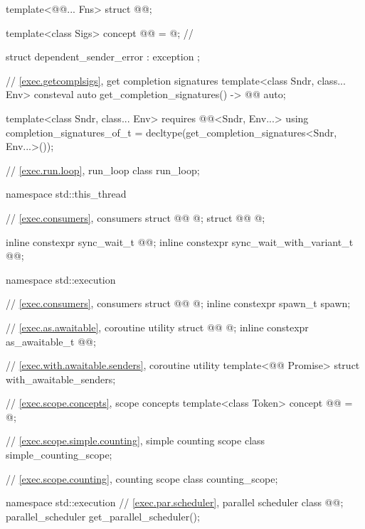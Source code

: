 \begin{codeblock}
{  template<@@... Fns>
    struct @@;

  template<class Sigs>
    concept @@ = @\seebelownc@;            // \expos

  struct dependent_sender_error : exception {};

  // \ref{exec.getcomplsigs}, get completion signatures
  template<class Sndr, class... Env>
    consteval auto get_completion_signatures() -> @@ auto;

  template<class Sndr, class... Env>
      requires @@<Sndr, Env...>
    using completion_signatures_of_t = decltype(get_completion_signatures<Sndr, Env...>());

  // \ref{exec.run.loop}, run_loop
  class run_loop;
}

namespace std::this_thread {
  // \ref{exec.consumers}, consumers
  struct @@ { @\unspec@ };
  struct @@ { @\unspec@ };

  inline constexpr sync_wait_t @@{};
  inline constexpr sync_wait_with_variant_t @@{};
}

namespace std::execution {
  // \ref{exec.consumers}, consumers
  struct @@ { @\unspec@ };
  inline constexpr spawn_t spawn{};

  // \ref{exec.as.awaitable}, coroutine utility 
  struct @@ { @\unspec@ };
  inline constexpr as_awaitable_t @@{};

  // \ref{exec.with.awaitable.senders}, coroutine utility 
  template<@@ Promise>
    struct with_awaitable_senders;

  // \ref{exec.scope.concepts}, scope concepts
  template<class Token>
    concept @@ = @\seebelow@;

  // \ref{exec.scope.simple.counting}, simple counting scope
  class simple_counting_scope;

  // \ref{exec.scope.counting}, counting scope
  class counting_scope;
}

namespace std::execution {
  // \ref{exec.par.scheduler}, parallel scheduler
  class @@;
  parallel_scheduler get_parallel_scheduler();
}


\end{codeblock}
